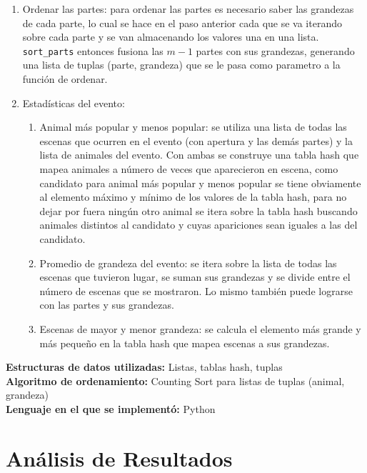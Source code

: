 \documentclass{article}
\begin{document}
\begin{enumerate}
\begin{enumerate}
					\end{enumerate}
				\item Ordenar las partes: para ordenar las partes es necesario saber las grandezas de cada parte, lo cual se hace en el paso
					anterior cada que se va iterando sobre cada parte y se van almacenando los valores una en una lista. \texttt{sort\_parts}
					entonces fusiona las $m-1$ partes con sus grandezas, generando una lista de tuplas (parte, grandeza) que se le pasa
					como parametro a la función de ordenar.
				\item Estadísticas del evento: 
					\begin{enumerate}
						\item Animal más popular y menos popular: se utiliza una lista de todas
						las escenas que ocurren en el evento (con apertura y las demás partes) y la lista de animales del evento. Con ambas se construye
						una tabla hash que mapea animales a número de veces que aparecieron en escena, como candidato para animal más popular y menos popular
						se tiene obviamente al elemento máximo y mínimo de los valores de la tabla hash, para no dejar por fuera ningún otro animal
						se itera sobre la tabla hash buscando animales distintos al candidato y cuyas apariciones sean iguales a las del candidato. 
						\item Promedio de grandeza del evento: se itera sobre la lista de todas las escenas que tuvieron lugar, se suman sus grandezas
							y se divide entre el número de escenas que se mostraron. Lo mismo también puede lograrse con las partes y sus grandezas.

						\item Escenas de mayor y menor grandeza: se calcula el elemento más grande y más pequeño en la tabla hash que mapea escenas
							a sus grandezas.
					\end{enumerate}
			\end{enumerate}
			\textbf{Estructuras de datos utilizadas:} Listas, tablas hash, tuplas\\
			\textbf{Algoritmo de ordenamiento:} Counting Sort para listas de tuplas (animal, grandeza)\\
			\textbf{Lenguaje en el que se implementó:} Python
	\section{Análisis de Resultados}
\end{document}
